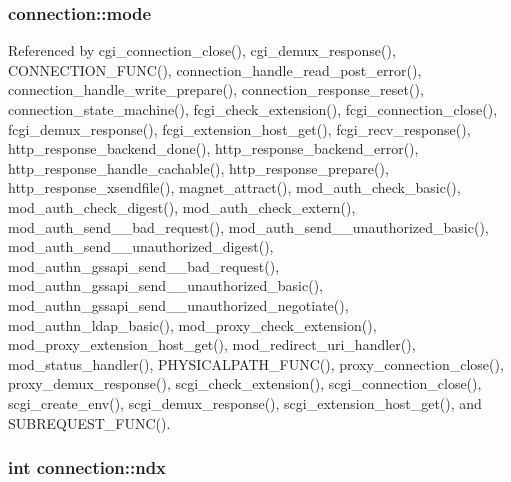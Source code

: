 \hypertarget{structconnection_a678265f403b80798cd979f7e8108cdaf}{
\subsubsection[{mode}]{ connection\-::mode}}\label{structconnection_a678265f403b80798cd979f7e8108cdaf}


Referenced by cgi\-\_\-connection\-\_\-close(), cgi\-\_\-demux\-\_\-response(), C\-O\-N\-N\-E\-C\-T\-I\-O\-N\-\_\-\-F\-U\-N\-C(), connection\-\_\-handle\-\_\-read\-\_\-post\-\_\-error(), connection\-\_\-handle\-\_\-write\-\_\-prepare(), connection\-\_\-response\-\_\-reset(), connection\-\_\-state\-\_\-machine(), fcgi\-\_\-check\-\_\-extension(), fcgi\-\_\-connection\-\_\-close(), fcgi\-\_\-demux\-\_\-response(), fcgi\-\_\-extension\-\_\-host\-\_\-get(), fcgi\-\_\-recv\-\_\-response(), http\-\_\-response\-\_\-backend\-\_\-done(), http\-\_\-response\-\_\-backend\-\_\-error(), http\-\_\-response\-\_\-handle\-\_\-cachable(), http\-\_\-response\-\_\-prepare(), http\-\_\-response\-\_\-xsendfile(), magnet\-\_\-attract(), mod\-\_\-auth\-\_\-check\-\_\-basic(), mod\-\_\-auth\-\_\-check\-\_\-digest(), mod\-\_\-auth\-\_\-check\-\_\-extern(), mod\-\_\-auth\-\_\-send\-\_\-\_\-bad\-\_\-request(), mod\-\_\-auth\-\_\-send\-\_\-\_\-unauthorized\-\_\-basic(), mod\-\_\-auth\-\_\-send\-\_\-\_\-unauthorized\-\_\-digest(), mod\-\_\-authn\-\_\-gssapi\-\_\-send\-\_\-\_\-bad\-\_\-request(), mod\-\_\-authn\-\_\-gssapi\-\_\-send\-\_\-\_\-unauthorized\-\_\-basic(), mod\-\_\-authn\-\_\-gssapi\-\_\-send\-\_\-\_\-unauthorized\-\_\-negotiate(), mod\-\_\-authn\-\_\-ldap\-\_\-basic(), mod\-\_\-proxy\-\_\-check\-\_\-extension(), mod\-\_\-proxy\-\_\-extension\-\_\-host\-\_\-get(), mod\-\_\-redirect\-\_\-uri\-\_\-handler(), mod\-\_\-status\-\_\-handler(), P\-H\-Y\-S\-I\-C\-A\-L\-P\-A\-T\-H\-\_\-\-F\-U\-N\-C(), proxy\-\_\-connection\-\_\-close(), proxy\-\_\-demux\-\_\-response(), scgi\-\_\-check\-\_\-extension(), scgi\-\_\-connection\-\_\-close(), scgi\-\_\-create\-\_\-env(), scgi\-\_\-demux\-\_\-response(), scgi\-\_\-extension\-\_\-host\-\_\-get(), and S\-U\-B\-R\-E\-Q\-U\-E\-S\-T\-\_\-\-F\-U\-N\-C().

\hypertarget{structconnection_aadeba61ce7467142b9a766e9bfb7defa}{
\subsubsection[{ndx}]{\setlength{\rightskip}{0pt plus 5cm}int connection\-::ndx}}\label{structconnection_aadeba61ce7467142b9a766e9bfb7defa}


